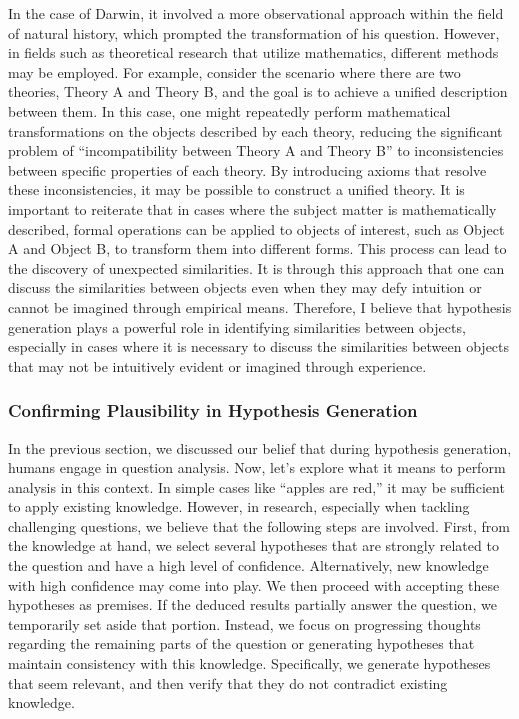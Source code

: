 \documentclass{book}
\begin{document}
In the case of Darwin, it involved a more observational approach within the field of natural history, which prompted the transformation of his question. However, in fields such as theoretical research that utilize mathematics, different methods may be employed. For example, consider the scenario where there are two theories, Theory A and Theory B, and the goal is to achieve a unified description between them. In this case, one might repeatedly perform mathematical transformations on the objects described by each theory, reducing the significant problem of ``incompatibility between Theory A and Theory B'' to inconsistencies between specific properties of each theory. By introducing axioms that resolve these inconsistencies, it may be possible to construct a unified theory. It is important to reiterate that in cases where the subject matter is mathematically described, formal operations can be applied to objects of interest, such as Object A and Object B, to transform them into different forms. This process can lead to the discovery of unexpected similarities. It is through this approach that one can discuss the similarities between objects even when they may defy intuition or cannot be imagined through empirical means. Therefore, I believe that hypothesis generation plays a powerful role in identifying similarities between objects, especially in cases where it is necessary to discuss the similarities between objects that may not be intuitively evident or imagined through experience.

\subsubsection{Confirming Plausibility in Hypothesis Generation}

In the previous section, we discussed our belief that during hypothesis generation, humans engage in question analysis. Now, let's explore what it means to perform analysis in this context. In simple cases like ``apples are red,'' it may be sufficient to apply existing knowledge. However, in research, especially when tackling challenging questions, we believe that the following steps are involved. First, from the knowledge at hand, we select several hypotheses that are strongly related to the question and have a high level of confidence. Alternatively, new knowledge with high confidence may come into play. We then proceed with accepting these hypotheses as premises. If the deduced results partially answer the question, we temporarily set aside that portion. Instead, we focus on progressing thoughts regarding the remaining parts of the question or generating hypotheses that maintain consistency with this knowledge. Specifically, we generate hypotheses that seem relevant, and then verify that they do not contradict existing knowledge.
\end{document}
